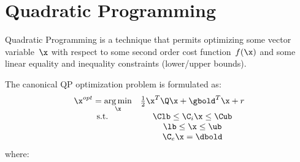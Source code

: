 
\chapter{Quadratic Programming}
\label{sec:qp}

Quadratic Programming is a technique that permits optimizing some
vector variable~$\x$ with respect to some second order cost function~$f(\x)$ and
some linear equality and inequality constraints (lower/upper bounds).

The canonical QP optimization problem is formulated as:
\begin{gather}
  \begin{array}{cc}
    \label{eqn:qp_canonical}
    \x^{opt}=
    \underset{\x}{\arg \min } & \frac{1}{2} \x^{T} \Q \x
                                +\gbold^{T} \x+r  \\
    \text { s.t. } & \Clb \leq \C_i \x \leq \Cub \\
                              & \lb \leq \x \leq \ub \\
                              & \C_e \x=\dbold
  \end{array}
\end{gather}
where:

